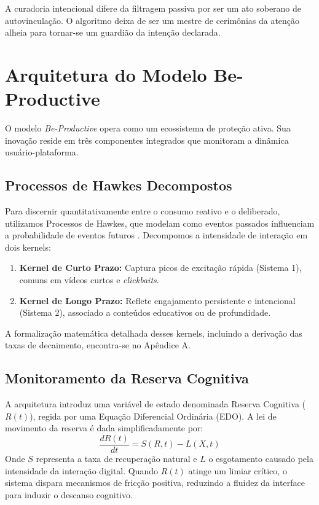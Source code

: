 A curadoria intencional difere da filtragem passiva por ser um ato soberano de autovinculação. O algoritmo deixa de ser um mestre de cerimônias da atenção alheia para tornar-se um guardião da intenção declarada.

\section{Arquitetura do Modelo Be-Productive}

O modelo \textit{Be-Productive} opera como um ecossistema de proteção ativa. Sua inovação reside em três componentes integrados que monitoram a dinâmica usuário-plataforma.

\subsection{Processos de Hawkes Decompostos}

Para discernir quantitativamente entre o consumo reativo e o deliberado, utilizamos Processos de Hawkes, que modelam como eventos passados influenciam a probabilidade de eventos futuros \parencite{rizoiu2017}. Decompomos a intensidade de interação em dois kernels:
\begin{enumerate}
    \item \textbf{Kernel de Curto Prazo:} Captura picos de excitação rápida (Sistema 1), comuns em vídeos curtos e \textit{clickbaits}.
    \item \textbf{Kernel de Longo Prazo:} Reflete engajamento persistente e intencional (Sistema 2), associado a conteúdos educativos ou de profundidade.
\end{enumerate}

A formalização matemática detalhada desses kernels, incluindo a derivação das taxas de decaimento, encontra-se no Apêndice A.

\subsection{Monitoramento da Reserva Cognitiva}

A arquitetura introduz uma variável de estado denominada Reserva Cognitiva ($R(t)$), regida por uma Equação Diferencial Ordinária (EDO). A lei de movimento da reserva é dada simplificadamente por:
\begin{equation}
    \frac{dR(t)}{dt} = S(R, t) - L(X, t)
\end{equation}
Onde $S$ representa a taxa de recuperação natural e $L$ o esgotamento causado pela intensidade da interação digital. Quando $R(t)$ atinge um limiar crítico, o sistema dispara mecanismos de fricção positiva, reduzindo a fluidez da interface para induzir o descanso cognitivo.

